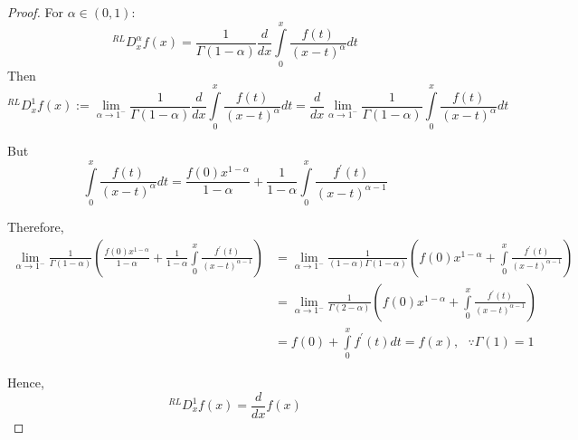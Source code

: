 \documentclass{amsart}%
\theoremstyle{plain}
\numberwithin{equation}{section}
\begin{document}
\begin{proof}
For $\alpha\in\left(  0,1\right)  :$
\[
^{RL}D_{x}^{\alpha}f(x)=\frac{1}{\Gamma\left(  1-\alpha\right)  }\frac{d}{dx}%
{\displaystyle\int\limits_{0}^{x}}
\frac{f(t)}{\left(  x-t\right)  ^{\alpha}}dt
\]
Then
\[
^{RL}D_{x}^{1}f(x):=\underset{\alpha\longrightarrow1^{-}}{\lim}\frac{1}%
{\Gamma\left(  1-\alpha\right)  }\frac{d}{dx}%
{\displaystyle\int\limits_{0}^{x}}
\frac{f(t)}{\left(  x-t\right)  ^{\alpha}}dt=\frac{d}{dx}\underset{\alpha
\longrightarrow1^{-}}{\lim}\frac{1}{\Gamma\left(  1-\alpha\right)  }%
{\displaystyle\int\limits_{0}^{x}}
\frac{f(t)}{\left(  x-t\right)  ^{\alpha}}dt
\]


But
\[%
{\displaystyle\int\limits_{0}^{x}}
\frac{f(t)}{\left(  x-t\right)  ^{\alpha}}dt=\frac{f(0)x^{1-\alpha}}{1-\alpha
}+\frac{1}{1-\alpha}%
{\displaystyle\int\limits_{0}^{x}}
\frac{f^{\prime}(t)}{(x-t)^{\alpha-1}}%
\]


Therefore,
\begin{align*}
\underset{\alpha\longrightarrow1^{-}}{\lim}\frac{1}{\Gamma\left(
1-\alpha\right)  }\left(  \frac{f(0)x^{1-\alpha}}{1-\alpha}+\frac{1}{1-\alpha}%
{\displaystyle\int\limits_{0}^{x}}
\frac{f^{\prime}(t)}{(x-t)^{\alpha-1}}\right)   & =\underset{\alpha
\longrightarrow1^{-}}{\lim}\frac{1}{(1-\alpha)\Gamma\left(  1-\alpha\right)
}\left(  f(0)x^{1-\alpha}+%
{\displaystyle\int\limits_{0}^{x}}
\frac{f^{\prime}(t)}{(x-t)^{\alpha-1}}\right) \\
& =\underset{\alpha\longrightarrow1^{-}}{\lim}\frac{1}{\Gamma\left(
2-\alpha\right)  }\left(  f(0)x^{1-\alpha}+%
{\displaystyle\int\limits_{0}^{x}}
\frac{f^{\prime}(t)}{(x-t)^{\alpha-1}}\right) \\
& =f(0)+%
{\displaystyle\int\limits_{0}^{x}}
f^{\prime}(t)dt=f(x),\text{ \ \ }\because\Gamma\left(  1\right)  =1
\end{align*}


Hence,
\[
^{RL}D_{x}^{1}f(x)=\frac{d}{dx}f(x)
\]

\end{proof}
\end{document}
